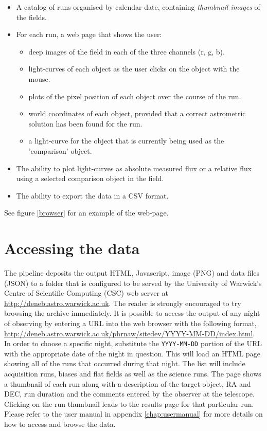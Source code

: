 \begin{itemize}
	\item A catalog of runs organised by calendar date, containing \emph{thumbnail images} of the fields.
	\item For each run, a web page that shows the user:
	\begin{itemize}
		\item deep images of the field in each of the three channels (r, g, b).
		\item light-curves of each object as the user clicks on the object with the mouse. 
		\item plots of the pixel position of each object over the course of the run.
		\item world coordinates of each object, provided that a correct astrometric solution has been found for the run. 
		\item a light-curve for the object that is currently being used as the 'comparison' object. 
	\end{itemize}
	\item The ability to plot light-curves as absolute measured flux or a relative flux using a selected comparison object in the field. 
	\item The ability to export the data in a CSV format.
	
\end{itemize}
See figure \ref{browser} for an example of the web-page. 


  
\section{Accessing the data}
The pipeline deposits the output HTML, Javascript, image (PNG) and data files (JSON) to a folder that is configured to be served by the University of Warwick's Centre of Scientific Computing (CSC) web server at \url{http://deneb.astro.warwick.ac.uk}. The reader is strongly encouraged to try browsing the archive immediately. It is possible to access the output of any night of observing by entering a URL into the web browser with the following format, \url{http://deneb.astro.warwick.ac.uk/phrnaw/sitedev/YYYY-MM-DD/index.html}. In order to choose a specific night, substitute the \texttt{YYYY-MM-DD} portion of the URL with the appropriate date of the night in question. This will load an HTML page showing all of the runs that occurred during that night. The list will include acquisition runs, biases and flat fields as well as the science runs. The page shows a thumbnail of each run along with a description of the target object, RA and DEC, run duration and the comments entered by the observer at the telescope. Clicking on the run thumbnail leads to the results page for that particular run. Please refer to the user manual in appendix \ref{chap:usermanual} for more details on how to access and browse the data.

